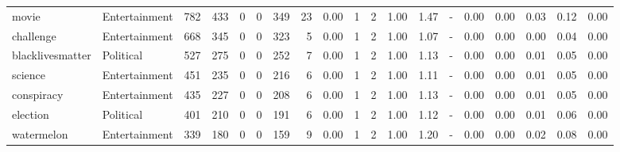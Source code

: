 \begin{tabular}{llrrrrrrrrrrrrrrrrr}
           movie &   Entertainment &    782 &    433 &                           0 &                            0 &           349 &                         23 &     0.00 &    1 &      2 & 1.00 &   1.47 &                                - &   0.00 &         0.00 &                                0.03 &                                   0.12 &                                     0.00 \\
       challenge &   Entertainment &    668 &    345 &                           0 &                            0 &           323 &                          5 &     0.00 &    1 &      2 & 1.00 &   1.07 &                                - &   0.00 &         0.00 &                                0.00 &                                   0.04 &                                     0.00 \\
blacklivesmatter &       Political &    527 &    275 &                           0 &                            0 &           252 &                          7 &     0.00 &    1 &      2 & 1.00 &   1.13 &                                - &   0.00 &         0.00 &                                0.01 &                                   0.05 &                                     0.00 \\
         science &   Entertainment &    451 &    235 &                           0 &                            0 &           216 &                          6 &     0.00 &    1 &      2 & 1.00 &   1.11 &                                - &   0.00 &         0.00 &                                0.01 &                                   0.05 &                                     0.00 \\
      conspiracy &   Entertainment &    435 &    227 &                           0 &                            0 &           208 &                          6 &     0.00 &    1 &      2 & 1.00 &   1.13 &                                - &   0.00 &         0.00 &                                0.01 &                                   0.05 &                                     0.00 \\
        election &       Political &    401 &    210 &                           0 &                            0 &           191 &                          6 &     0.00 &    1 &      2 & 1.00 &   1.12 &                                - &   0.00 &         0.00 &                                0.01 &                                   0.06 &                                     0.00 \\
      watermelon &   Entertainment &    339 &    180 &                           0 &                            0 &           159 &                          9 &     0.00 &    1 &      2 & 1.00 &   1.20 &                                - &   0.00 &         0.00 &                                0.02 &                                   0.08 &                                     0.00 \\

\end{tabular}
